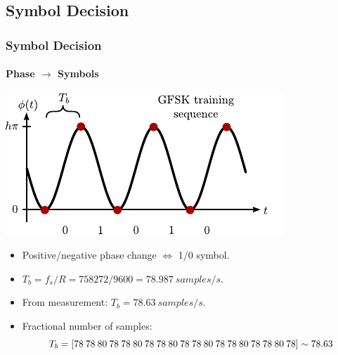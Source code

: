\subsection{Symbol Decision} \label{sec:symboldecision}

\begin{frame} \frametitle{Symbol Decision}
    \framesubtitle{Phase $\rightarrow$ Symbols}
    \begin{center}
        \includegraphics{img/symboldecision}
    \end{center}
    \begin{itemize}
    \item Positive/negative phase change $\Leftrightarrow$ 1/0 symbol.
    \item $T_b = f_s/R = \num{758272}/\num{9600} = \SI{78.987}{samples\per s }$.
    \item From measurement: $T_b = \SI{78.63}{samples\per s}$.
    \item Fractional number of samples:
        \begin{equation*}\tiny
            T_b = [78\ 78\ 80\ 78\ 78\ 80\ 78\ 78\ 80\ 78\ 78\ 80\ 78\ 78\ 80\ 78\ 78\ 80\ 78] \sim 78.63
        \end{equation*}
    \end{itemize}
\end{frame}

